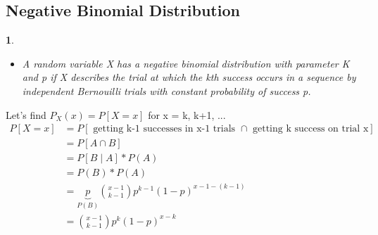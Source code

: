 \documentclass[11pt]{article}
\newtheorem{definition}{\framebox{DEF}}[section]
\newcommand\tab[1][1cm]{\hspace*{#1}}
\begin{document}
        \subsection{Negative Binomial Distribution}
            \begin{definition}\tab
                \begin{itemize}
                    \item A random variable X has a negative binomial distribution with parameter K and p
                            if X describes the trial at which the kth success occurs in a sequence 
                            by independent Bernouilli trials with constant probability of success p.
                \end{itemize}
            \end{definition}

            Let's find $P_X(x) = P[X = x]$ for x = k, k+1, ...
            \begin{align*}
                P[X=x]  &= P[\text{ getting k-1 successes in x-1 trials $\cap$ getting k success on trial x}] \\
                        &= P[A \cap B] \\
                        &= P[B \mid A]* P(A) \\
                        &= P(B)*P(A) \tag{by independence} \\
                        &= \underbrace{p}_{P(B)}  \binom{x-1}{k-1} p^{k-1} (1-p)^{x-1-(k-1)} \tag{for x = k, k+1,...}\\
                        &= \binom{x-1}{k-1}p^k(1-p)^{x-k} \tag{for x = k, k+1, ...}
            \end{align*}
\end{document}
